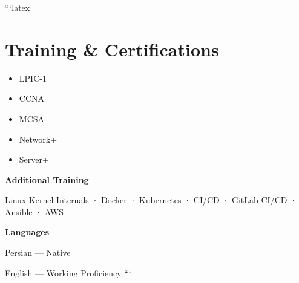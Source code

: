 ```latex
\section{Training \& Certifications}

\begin{itemize}

    \item LPIC-1
    \item CCNA
    \item MCSA
    \item Network+
    \item Server+

\end{itemize}

\vspace{2pt}

\textbf{Additional Training}

Linux Kernel Internals · Docker · Kubernetes · CI/CD · GitLab CI/CD · Ansible · AWS

\vspace{2pt}

\textbf{Languages}

Persian — Native

English — Working Proficiency
```

